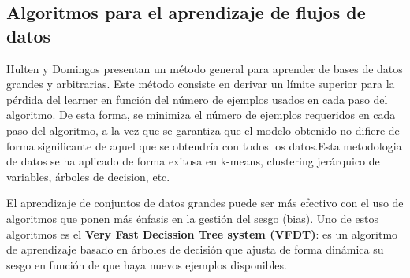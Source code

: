 \subsection{Algoritmos para el aprendizaje de flujos de datos}

Hulten y Domingos presentan un método general para aprender de bases de datos grandes y arbitrarias.
Este método consiste en derivar un límite superior para la pérdida del learner en función del número de ejemplos usados en cada paso del algoritmo. De esta forma, se minimiza el número de ejemplos requeridos en cada paso del algoritmo, a la vez que se garantiza que el modelo obtenido no difiere de forma significante de aquel que se obtendría con todos los datos.Esta metodologia de datos se ha aplicado de forma exitosa en k-means, clustering jerárquico de variables, árboles de decision, etc.

El aprendizaje de conjuntos de datos grandes puede ser más efectivo con el uso de algoritmos que ponen más énfasis en la gestión del sesgo (bias). Uno de estos algoritmos es el \textbf{Very Fast Decission Tree system (VFDT)}: es un algoritmo de aprendizaje basado en árboles de decisión que ajusta de forma dinámica su sesgo en función
de que haya nuevos ejemplos disponibles.

